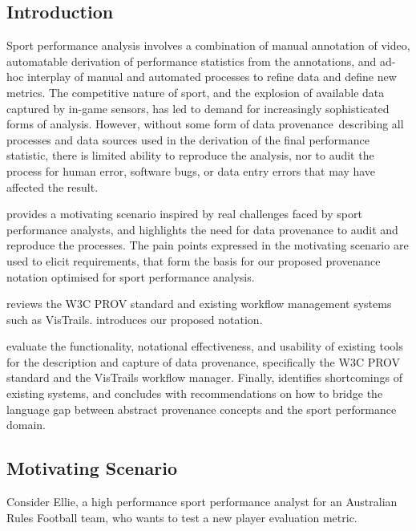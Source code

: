 \subsection{Introduction}

{Sport performance analysis involves a combination of manual annotation
of video, automatable derivation of performance statistics from the
annotations, and ad-hoc interplay of manual and automated processes to
refine data and define new metrics. The competitive nature of sport, and
the explosion of available data captured by in-game sensors, has led
to demand for increasingly sophisticated forms of analysis. However,
without some form of data }{provenance}{~describing all processes and
data sources used in the derivation of the final performance statistic,
there is limited ability to reproduce the analysis, nor to audit the
process for human error, software bugs, or data entry errors that may
have affected the result.}

{}

{ provides a motivating scenario inspired by real challenges
faced by sport performance analysts, and highlights the need for data
provenance to audit and reproduce the processes. The pain points expressed in the motivating scenario are
used to elicit requirements, that form the basis for our proposed
provenance notation optimised for sport performance analysis.}

 reviews the W3C PROV standard and existing workflow management systems such as VisTrails.  introduces our proposed notation.

{ evaluate the functionality, notational effectiveness, and
usability of existing tools for the description and capture of data
provenance, specifically the W3C PROV standard and the VisTrails
workflow manager. Finally,  identifies shortcomings of existing systems, and  concludes with recommendations on how to bridge the language gap between abstract provenance concepts and the sport performance domain.}

\subsection{Motivating Scenario}\label{sec:provmotivation}

{Consider Ellie, a high performance sport performance analyst for an
Australian Rules Football team, who wants to test a new player
evaluation metric.}

